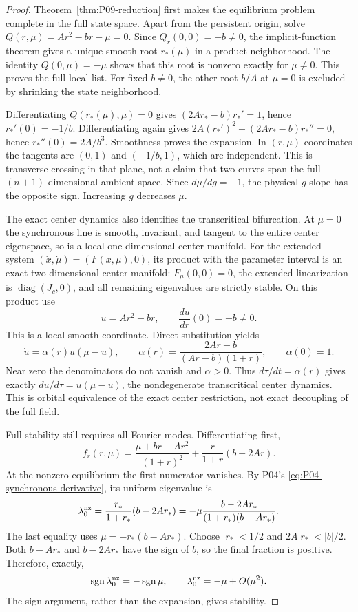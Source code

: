 \begin{proof}
Theorem~\ref{thm:P09-reduction} first makes the equilibrium problem
complete in the full state space. Apart from the persistent origin,
solve $Q(r,\mu)=Ar^2-br-\mu=0$. Since $Q_r(0,0)=-b\ne0$,
the implicit-function theorem gives a unique smooth root $r_*(\mu)$
in a product neighborhood. The identity $Q(0,\mu)=-\mu$ shows that
this root is nonzero exactly for $\mu\ne0$. This proves the full local
list. For fixed $b\ne0$, the other root $b/A$ at $\mu=0$ is excluded
by shrinking the state neighborhood.

Differentiating $Q(r_*(\mu),\mu)=0$ gives
$(2Ar_*-b)r_*'=1$, hence $r_*'(0)=-1/b$.
Differentiating again gives
$2A(r_*')^2+(2Ar_*-b)r_*''=0$, hence $r_*''(0)=2A/b^3$.
Smoothness proves the expansion. In $(r,\mu)$ coordinates the tangents
are $(0,1)$ and $(-1/b,1)$, which are independent. This is transverse
crossing in that plane, not a claim that two curves span the full
$(n+1)$-dimensional ambient space. Since $d\mu/dg=-1$, the physical
$g$ slope has the opposite sign. Increasing $g$ decreases $\mu$.

The exact center dynamics also identifies the transcritical bifurcation.
At $\mu=0$ the synchronous line is smooth, invariant, and tangent to
the entire center eigenspace, so is a local one-dimensional center
manifold. For the extended system
$(\dot x,\dot\mu)=(F(x,\mu),0)$, its product with the parameter
interval is an exact two-dimensional center manifold:
$F_\mu(0,0)=0$, the extended linearization is
$\operatorname{diag}(J_c,0)$, and all remaining eigenvalues are strictly
stable. On this product use
\[
 u=Ar^2-br,\qquad \frac{du}{dr}(0)=-b\ne0.
\]
This is a local smooth coordinate. Direct substitution yields
\begin{equation}
 \dot u=\alpha(r)u(\mu-u),\qquad
 \alpha(r)=\frac{2Ar-b}{(Ar-b)(1+r)},\qquad\alpha(0)=1.
 \label{eq:P09-exact-normal-form}
\end{equation}
Near zero the denominators do not vanish and $\alpha>0$. Thus
$d\tau/dt=\alpha(r)$ gives exactly $du/d\tau=u(\mu-u)$, the
nondegenerate transcritical center dynamics. This is orbital equivalence
of the exact center restriction, not exact decoupling of the full field.

Full stability still requires all Fourier modes. Differentiating first,
\[
 f_r(r,\mu)=\frac{\mu+br-Ar^2}{(1+r)^2}
                  +\frac r{1+r}(b-2Ar).
\]
At the nonzero equilibrium the first numerator vanishes. By P04's
\eqref{eq:P04-synchronous-derivative}, its uniform eigenvalue is
\begin{equation}
 \lambda_0^{\rm nz}=\frac{r_*}{1+r_*}(b-2Ar_*)
 =-\mu\frac{b-2Ar_*}{(1+r_*)(b-Ar_*)}.
 \label{eq:P09-uniform-nonzero}
\end{equation}
The last equality uses $\mu=-r_*(b-Ar_*)$. Choose $|r_*|<1/2$ and
$2A|r_*|<|b|/2$. Both $b-Ar_*$ and $b-2Ar_*$ have the sign of
$b$, so the final fraction is positive. Therefore, exactly,
\begin{equation}
 \operatorname{sgn}\lambda_0^{\rm nz}=-\operatorname{sgn}\mu,
 \qquad\lambda_0^{\rm nz}=-\mu+O(\mu^2).
 \label{eq:P09-uniform-sign}
\end{equation}
The sign argument, rather than the expansion, gives stability.


\end{proof}
